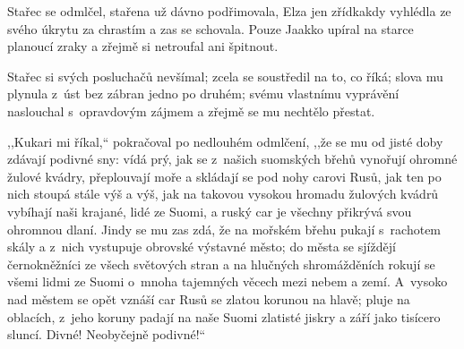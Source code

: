 Stařec se odmlčel, stařena už dávno podřimovala, Elza jen zřídkakdy vyhlédla ze svého úkrytu za chrastím a zas se schovala. Pouze Jaakko upíral na starce planoucí zraky a zřejmě si netroufal ani špitnout.

Stařec si svých posluchačů nevšímal; zcela se soustředil na to, co říká; slova mu plynula z úst bez zábran jedno po druhém; svému vlastnímu vyprávění naslouchal s opravdovým zájmem a zřejmě se mu nechtělo přestat.

,,Kukari mi říkal,`` pokračoval po nedlouhém odmlčení, ,,že se mu od jisté doby zdávají podivné sny: vídá prý, jak se z našich suomských břehů vynořují ohromné žulové kvádry, přeplouvají moře a skládají se pod nohy carovi Rusů, jak ten po nich stoupá stále výš a výš, jak na takovou vysokou hromadu žulových kvádrů vybíhají naši krajané, lidé ze Suomi, a ruský car je všechny přikrývá svou ohromnou dlaní. Jindy se mu zas zdá, že na mořském břehu pukají s rachotem skály a z nich vystupuje obrovské výstavné město; do města se sjíždějí černokněžníci ze všech světových stran a na hlučných shromážděních rokují se všemi lidmi ze Suomi o~mnoha tajemných věcech mezi nebem a zemí. A~vysoko nad městem se opět vznáší car Rusů se zlatou korunou na hlavě; pluje na oblacích, z jeho koruny padají na naše Suomi zlatisté jiskry a září jako tisícero sluncí. Divné! Neobyčejně podivné!``

